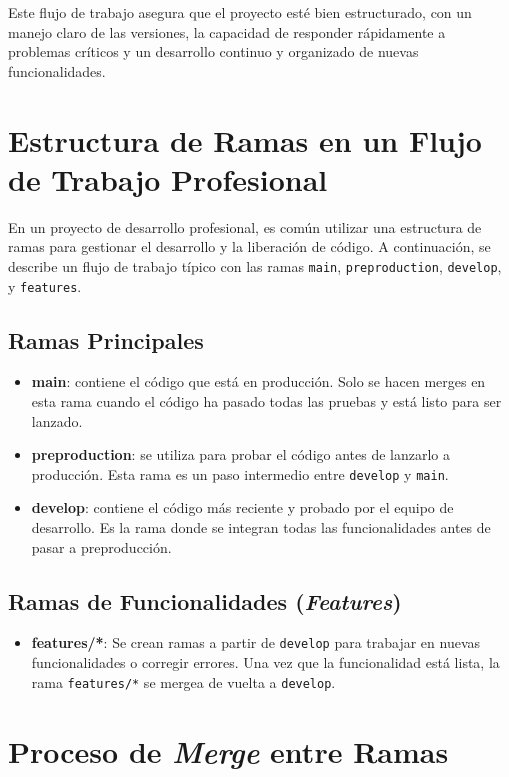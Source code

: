 \documentclass{template/uem_theme}
\begin{document}
Este flujo de trabajo asegura que el proyecto esté bien estructurado, con un manejo claro de las versiones, la capacidad de responder rápidamente a problemas críticos y un desarrollo continuo y organizado de nuevas funcionalidades.

\section{Estructura de Ramas en un Flujo de Trabajo Profesional}
En un proyecto de desarrollo profesional, es común utilizar una estructura de ramas para gestionar el desarrollo y la liberación de código. A continuación, se describe un flujo de trabajo típico con las ramas \texttt{main}, \texttt{preproduction}, \texttt{develop}, y \texttt{features}.

\subsection{Ramas Principales}
\begin{itemize}
    \item \textbf{main}: contiene el código que está en producción. Solo se hacen merges en esta rama cuando el código ha pasado todas las pruebas y está listo para ser lanzado.
    \item \textbf{preproduction}: se utiliza para probar el código antes de lanzarlo a producción. Esta rama es un paso intermedio entre \texttt{develop} y \texttt{main}.
    \item \textbf{develop}: contiene el código más reciente y probado por el equipo de desarrollo. Es la rama donde se integran todas las funcionalidades antes de pasar a preproducción.
\end{itemize}

\subsection{Ramas de Funcionalidades (\textit{Features})}
\begin{itemize}
    \item \textbf{features/*}: Se crean ramas a partir de \texttt{develop} para trabajar en nuevas funcionalidades o corregir errores. Una vez que la funcionalidad está lista, la rama \texttt{features/*} se mergea de vuelta a \texttt{develop}.
\end{itemize}

\section{Proceso de \textit{Merge} entre Ramas}
\end{document}
